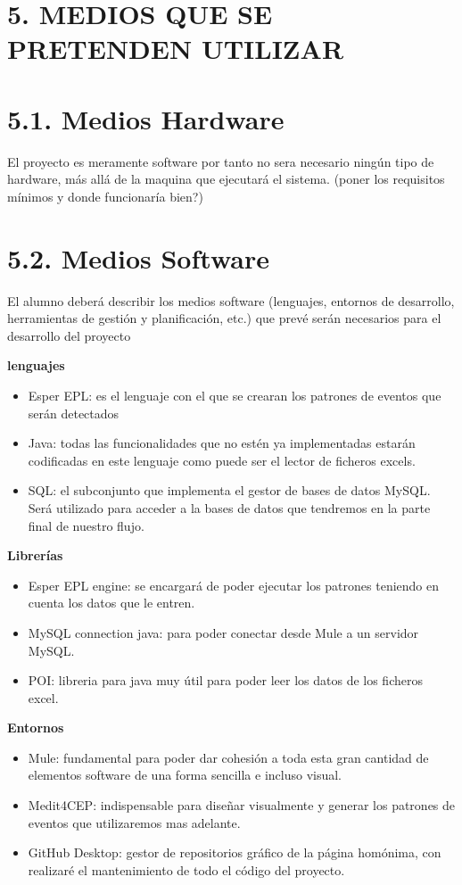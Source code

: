 \documentclass[a4paper]{article}
\begin{document}
\section{5. MEDIOS QUE SE PRETENDEN UTILIZAR}
\section{5.1. Medios Hardware}

El proyecto es meramente software por tanto no sera necesario ningún tipo de hardware, más allá de la maquina que ejecutará el sistema. (poner los requisitos mínimos y donde funcionaría bien?)

\section{5.2. Medios Software}

El alumno deber\'a describir los medios software (lenguajes, entornos de desarrollo, herramientas de gesti\'on y
planificaci\'on, etc.) que prev\'e ser\'an necesarios para el desarrollo del proyecto

\textbf{lenguajes}
\begin{itemize}
\item Esper EPL: es el lenguaje con el que se crearan los patrones de eventos que serán detectados
\item Java: todas las funcionalidades que no estén ya implementadas estarán codificadas en este lenguaje como puede ser el lector de ficheros excels.
\item SQL: el subconjunto que implementa el gestor de bases de datos MySQL. Será utilizado para acceder a la bases de datos que tendremos en la parte final de nuestro flujo.
\end{itemize}

\textbf{Librerías}
\begin{itemize}
\item Esper EPL engine: se encargará de poder ejecutar los patrones teniendo en cuenta los datos que le entren.
\item MySQL connection java: para poder conectar desde Mule a un servidor MySQL.
\item POI: libreria para java muy útil para poder leer los datos de los ficheros excel.
\end{itemize}

\textbf{Entornos}
\begin{itemize}
\item Mule: fundamental para poder dar cohesión a toda esta gran cantidad de elementos software de una forma sencilla e incluso visual.
\item Medit4CEP: indispensable para diseñar visualmente y generar los patrones de eventos que utilizaremos mas adelante.
\item GitHub Desktop: gestor de repositorios gráfico de la página homónima, con realizaré el mantenimiento de todo el código del proyecto.
\end{itemize}
\end{document}
